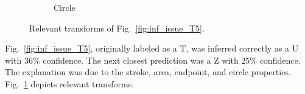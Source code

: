 \documentclass[conference]{IEEEtran}
\begin{document}
\begin{figure}[h]
\begin{subfigure}{.20\columnwidth}
        \caption{Circle}
    \end{subfigure}%
    \caption{Relevant transforms of Fig.~\ref{fig:inf_issue_T5}.}
    \label{fig:t5_trans}
\end{figure}

Fig.~\ref{fig:inf_issue_T5}, originally labeled as a T, was inferred correctly as
a U with 36\% confidence. The next closest prediction was a Z with 25\%
confidence.  The explanation was due to the stroke, area,
endpoint, and circle properties. Fig.~\ref{fig:t5_trans}
depicts relevant transforms.
\end{document}
